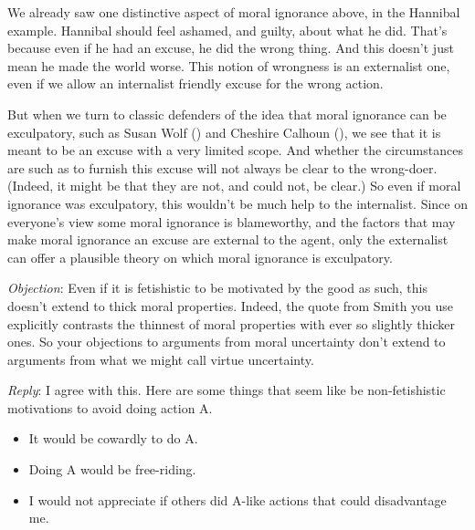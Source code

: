 \documentclass[
  11pt,
  letterpaper,
  DIV=11,
  numbers=noendperiod,
  twoside]{scrartcl}
\providecommand{\tightlist}{%
  \setlength{\itemsep}{0pt}\setlength{\parskip}{0pt}}
\begin{document}
We already saw one distinctive aspect of moral ignorance above, in the
Hannibal example. Hannibal should feel ashamed, and guilty, about what
he did. That's because even if he had an excuse, he did the wrong thing.
And this doesn't just mean he made the world worse. This notion of
wrongness is an externalist one, even if we allow an internalist
friendly excuse for the wrong action.

But when we turn to classic defenders of the idea that moral ignorance
can be exculpatory, such as Susan Wolf ()
and Cheshire Calhoun (), we see that it
is meant to be an excuse with a very limited scope. And whether the
circumstances are such as to furnish this excuse will not always be
clear to the wrong-doer. (Indeed, it might be that they are not, and
could not, be clear.) So even if moral ignorance was exculpatory, this
wouldn't be much help to the internalist. Since on everyone's view some
moral ignorance is blameworthy, and the factors that may make moral
ignorance an excuse are external to the agent, only the externalist can
offer a plausible theory on which moral ignorance is exculpatory.

\emph{Objection}: Even if it is fetishistic to be motivated by the good
as such, this doesn't extend to thick moral properties. Indeed, the
quote from Smith you use explicitly contrasts the thinnest of moral
properties with ever so slightly thicker ones. So your objections to
arguments from moral uncertainty don't extend to arguments from what we
might call virtue uncertainty.

\emph{Reply}: I agree with this. Here are some things that seem like be
non-fetishistic motivations to avoid doing action A.

\begin{itemize}
\tightlist
\item
  It would be cowardly to do A.
\item
  Doing A would be free-riding.
\item
  I would not appreciate if others did A-like actions that could
  disadvantage me.
\end{itemize}
\end{document}

